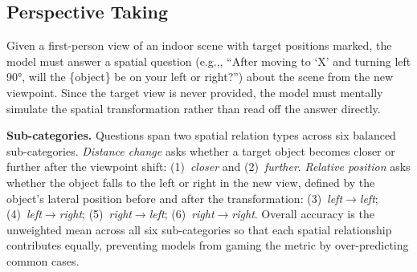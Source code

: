 \documentclass{llmxive}
\providecommand{\eg}{e.g.,\xspace}
\begin{document}
\subsection{Perspective Taking}
\label{sec:perspective_taking}

Given a first-person view of an indoor scene with target positions marked, the model must answer a spatial question (\eg, ``After moving to `X' and turning left 90°, will the \{object\} be on your left or right?'') about the scene from the new viewpoint. Since the target view is never provided, the model must mentally simulate the spatial transformation rather than read off the answer directly.

\noindent\textbf{Sub-categories.}
Questions span two spatial relation types across six balanced sub-categories.
\emph{Distance change} asks whether a target object becomes closer or further after the viewpoint shift: (1)~\emph{closer} and (2)~\emph{further}.
\emph{Relative position} asks whether the object falls to the left or right in the new view, defined by the object's lateral position before and after the transformation: (3)~\emph{left$\to$left}; (4)~\emph{left$\to$right}; (5)~\emph{right$\to$left}; (6)~\emph{right$\to$right}.
Overall accuracy is the unweighted mean across all six sub-categories so that each spatial relationship contributes equally, preventing models from gaming the metric by over-predicting common cases.
\end{document}
